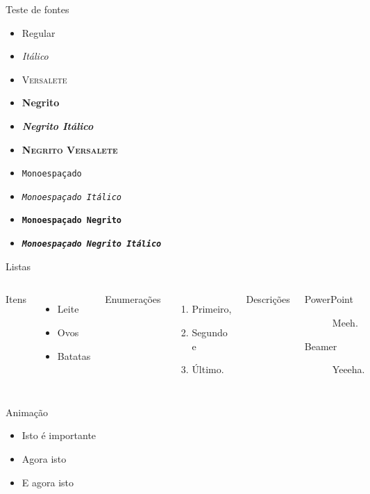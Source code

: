 \begin{frame}{Teste de fontes}
  \begin{itemize}
    \item Regular
    \item \textit{Itálico}
    \item \textsc{Versalete}
    \item \textbf{Negrito}
    \item \textbf{\textit{Negrito Itálico}}
    \item \textbf{\textsc{Negrito Versalete}}
    \item \texttt{Monoespaçado}
    \item \texttt{\textit{Monoespaçado Itálico}}
    \item \texttt{\textbf{Monoespaçado Negrito}}
    \item \texttt{\textbf{\textit{Monoespaçado Negrito Itálico}}}
  \end{itemize}
\end{frame}

\begin{frame}{Listas}
  \begin{columns}[T,onlytextwidth]
      Itens
      \begin{itemize}
        \item Leite \item Ovos \item Batatas
      \end{itemize}

      Enumerações
      \begin{enumerate}
        \item Primeiro, \item Segundo e \item Último.
      \end{enumerate}

      Descrições
      \begin{description}
        \item[PowerPoint] Meeh. \item[Beamer] Yeeeha.
      \end{description}
  \end{columns}
\end{frame}

\begin{frame}{Animação}
  \begin{itemize}[<+- | alert@+>]
    \item \alert<4>{Isto é importante}
    \item Agora isto
    \item E agora isto
  \end{itemize}
\end{frame}

